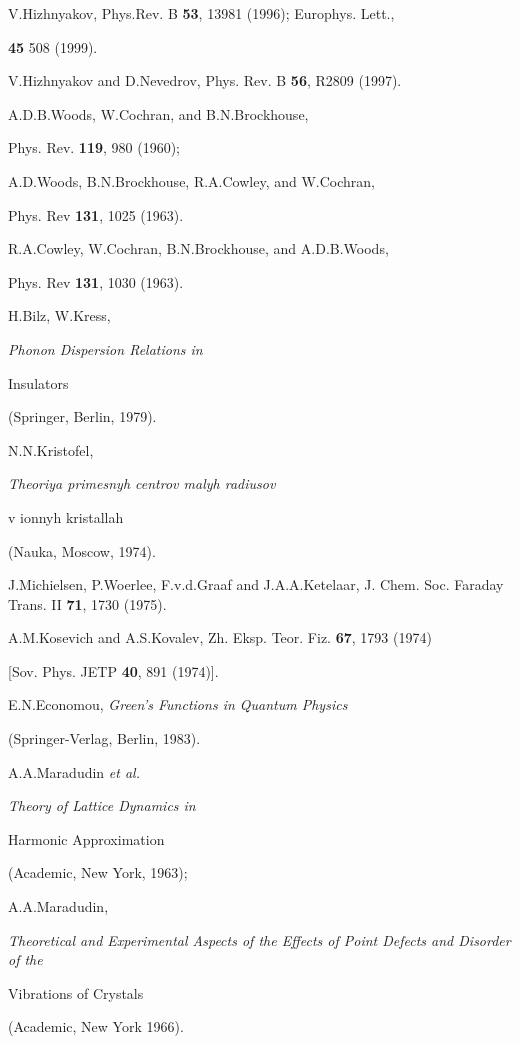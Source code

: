 {{\begin{thebibliography}{99}

V.Hizhnyakov, Phys.Rev. B {\bf 53}, 13981 (1996); Europhys. Lett., 

{\bf 45} 508 (1999).  


V.Hizhnyakov and D.Nevedrov, Phys. Rev. B {\bf 56}, R2809 (1997). 


A.D.B.Woods, W.Cochran, and B.N.Brockhouse,

Phys. Rev. {\bf 119}, 980 (1960);

A.D.Woods, B.N.Brockhouse, R.A.Cowley, and W.Cochran,

Phys. Rev {\bf 131}, 1025 (1963).

R.A.Cowley, W.Cochran, B.N.Brockhouse, and A.D.B.Woods,

Phys. Rev {\bf 131}, 1030 (1963).


H.Bilz, W.Kress, {\it Phonon Dispersion Relations in

Insulators} (Springer, Berlin, 1979).


N.N.Kristofel, {\it Theoriya primesnyh centrov malyh radiusov

v ionnyh kristallah}  (Nauka, Moscow, 1974).


J.Michielsen, P.Woerlee, F.v.d.Graaf and J.A.A.Ketelaar, J. Chem. Soc. Faraday Trans. II {\bf 71}, 1730 (1975).


A.M.Kosevich and A.S.Kovalev, Zh. Eksp. Teor. Fiz. {\bf 67}, 1793 (1974)

[Sov. Phys. JETP {\bf 40}, 891 (1974)].


E.N.Economou, {\it Green's Functions in Quantum Physics} 

(Springer-Verlag, Berlin, 1983). 


A.A.Maradudin {\it et al.} {\it Theory of Lattice Dynamics in  

Harmonic Approximation} (Academic, New York, 1963);   

A.A.Maradudin, {\it Theoretical and Experimental Aspects of the 
Effects of Point Defects and Disorder of the  

Vibrations of Crystals} (Academic, New York 1966).  



\end{thebibliography}}}
